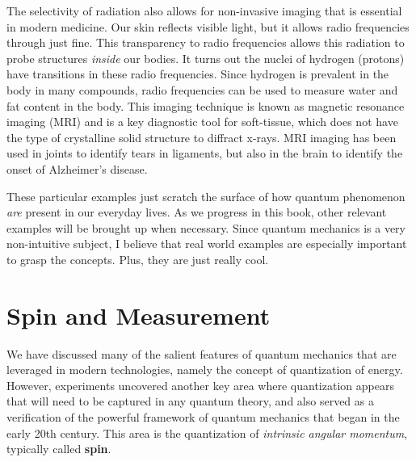 The selectivity of radiation also allows for non-invasive imaging that is essential in modern medicine. Our skin reflects visible light, but it allows radio frequencies through just fine. This transparency to radio frequencies allows this radiation to probe structures \textit{inside} our bodies. It turns out the nuclei of hydrogen (protons) have transitions in these radio frequencies. Since hydrogen is prevalent in the body in many compounds, radio frequencies can be used to measure water and fat content in the body. This imaging technique is known as magnetic resonance imaging (MRI) and is a key diagnostic tool for soft-tissue, which does not have the type of crystalline solid structure to diffract x-rays. MRI imaging has been used in joints to identify tears in ligaments, but also in the brain to identify the onset of Alzheimer's disease. 

These particular examples just scratch the surface of how quantum phenomenon \textit{are} present in our everyday lives. As we progress in this book, other relevant examples will be brought up when necessary. Since quantum mechanics is a very non-intuitive subject, I believe that real world examples are especially important to grasp the concepts. Plus, they are just really cool. 


\section{Spin and Measurement}

We have discussed many of the salient features of quantum mechanics that are leveraged in modern technologies, namely the concept of quantization of energy. However, experiments uncovered another key area where quantization appears that will need to be captured in any quantum theory, and also served as a verification of the powerful framework of quantum mechanics that began in the early 20th century. This area is the quantization of \textit{intrinsic angular momentum}, typically called \textbf{spin}. 

